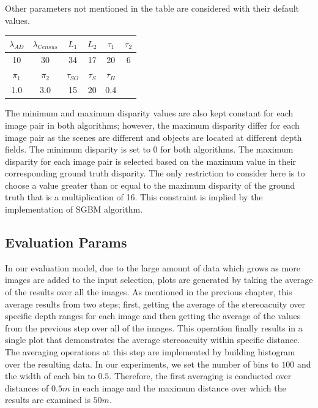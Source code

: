 Other parameters not mentioned in the table are considered with their default values. \newline

{\footnotesize
\begin{minipage}{0.8\linewidth}
\begin{center}
\label{tab:adcparams}
\begin{tabular}{|c|c|c|c|c|c|}
\hline
$\lambda_{AD}$ & $\lambda_{Census}$ & $L_{1}$ & $L_{2}$ & $\tau_{1}$ & $\tau_{2}$ \\  \hline
10 & 30 & 34 & 17 & 20 & 6  \\ \hline
$\pi_{1}$ & $\pi_{2}$ & $\tau_{SO}$ & $\tau_{S}$ & $\tau_{H}$ & \\  \hline
1.0 & 3.0 & 15 & 20 & 0.4 &  \\ \hline
\end{tabular}
\end{center}
\end{minipage} \newline
}

The minimum and maximum disparity values are also kept constant for each image pair in both algorithms; however, the maximum 
disparity differ for each image pair as the scenes are different
and objects are located at different depth fields.
The minimum disparity is set to $0$ for both algorithms. The maximum disparity for each image pair is selected based on the maximum value in their
corresponding ground truth disparity. The only restriction to consider here is to choose a value greater than or equal to 
the maximum disparity of the ground truth that is a multiplication of 16. This constraint
is implied by the implementation of SGBM algorithm.

\subsection{Evaluation Params}
In our evaluation model, due to the large amount of data which grows as more images are added to the input selection, 
plots are generated by taking the average of the results over all the images. As mentioned in the previous chapter, this average results from two steps; 
first, getting the average of the stereoacuity over specific
depth ranges for each image and then getting the average of the values from the previous step over all of the images. This operation finally results in a single plot
that demonstrates the average stereoacuity within specific distance.
The averaging operations at this step are implemented by building histogram over the resulting data. 
In our experiments, we set the number of bins to $100$ and the width of each bin to $0.5$. Therefore, the first averaging is conducted over distances of $0.5m$ 
in each image and the maximum distance over which the results are 
examined is $50m$.

